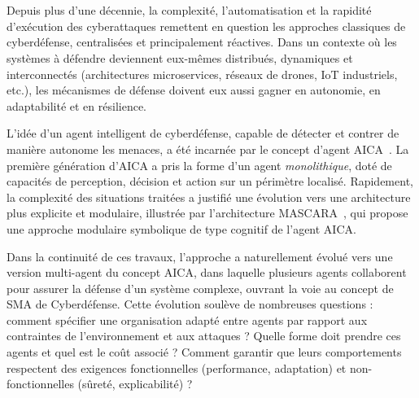 \cleardoublepage{}
\cleardoublepage
{}

\

\vspace{1em}

\bigskip

\\

Depuis plus d'une décennie, la complexité, l'automatisation et la rapidité d'exécution des cyberattaques remettent en question les approches classiques de cyberdéfense, centralisées et principalement réactives. Dans un contexte où les systèmes à défendre deviennent eux-mêmes distribués, dynamiques et interconnectés (architectures microservices, réseaux de drones, IoT industriels, etc.), les mécanismes de défense doivent eux aussi gagner en autonomie, en adaptabilité et en résilience.

L'idée d'un agent intelligent de cyberdéfense, capable de détecter et contrer de manière autonome les menaces, a été incarnée par le concept d'agent \ac{AICA}~\cite{Kott2023}. La première génération d'AICA a pris la forme d'un agent \textit{monolithique}, doté de capacités de perception, décision et action sur un périmètre localisé. Rapidement, la complexité des situations traitées a justifié une évolution vers une architecture plus explicite et modulaire, illustrée par l'architecture \ac{MASCARA}~\cite{Kott2023}, qui propose une approche modulaire symbolique de type cognitif de l'agent AICA.

Dans la continuité de ces travaux, l'approche a naturellement évolué vers une version multi-agent du concept AICA, dans laquelle plusieurs agents collaborent pour assurer la défense d'un système complexe, ouvrant la voie au concept de SMA de Cyberdéfense. Cette évolution soulève de nombreuses questions : comment spécifier une organisation adapté entre agents par rapport aux contraintes de l'environnement et aux attaques ? Quelle forme doit prendre ces agents et quel est le coût associé ? Comment garantir que leurs comportements respectent des exigences fonctionnelles (performance, adaptation) et non-fonctionnelles (sûreté, explicabilité) ?

\

\bigskip

\\

